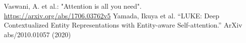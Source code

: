 \documentclass[12pt,fleqn]{article}
\begin{document}
\begin{thebibliography}{9}
     Vaswani, A. et al.: "Attention is all you need". \url{https://arxiv.org/abs/1706.03762v5}
     Yamada, Ikuya et al. “LUKE: Deep Contextualized Entity Representations with Entity-aware Self-attention.” ArXiv abs/2010.01057 (2020)

\end{thebibliography}
\end{document}
